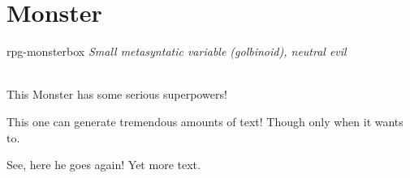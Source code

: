 \documentclass[{../book.tex}]{subfiles}
\begin{document}
\section{Monster}
\begin{rpg-monsterbox}{rpg-monsterbox}
	\textit{Small metasyntatic variable (golbinoid), neutral evil}\\
	\rpghline
	\basics[%
	armorclass = 12,
	hitpoints  = 16 (3d8 + 3),
	speed      = 50 t
	]
	\rpghline
	\stats[ %
    STR = 12, 
    DEX = 7
	]
	\rpghline
	\details[%
	languages = {Common Lisp, Erlang},
	]
	\rpghline \\[1mm]
	\begin{rpg-monsteraction}
		This Monster has some serious superpowers!
	\end{rpg-monsteraction}

	\begin{rpg-monsteraction}
		This one can generate tremendous amounts of text! Though only when it wants to.
	\end{rpg-monsteraction}

	\begin{rpg-monsteraction}
    See, here he goes again! Yet more text.
	\end{rpg-monsteraction}
\end{rpg-monsterbox}
\end{document}
